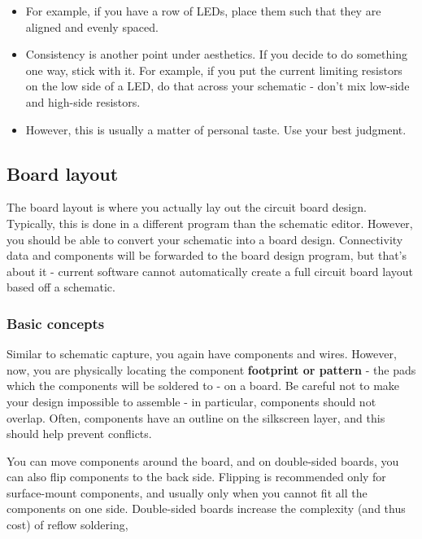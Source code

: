 \documentclass[letterpaper]{article}
\begin{document}
\begin{itemize}
\begin{itemize}
\item {\sffamily\color[rgb]{0.30980393,0.5058824,0.7411765}
For example, if you have a row of LEDs, place them such that they are aligned and evenly spaced.}
\item {\sffamily\color[rgb]{0.30980393,0.5058824,0.7411765}
Consistency is another point under aesthetics. If you decide to do something one way, stick with it. For example, if you
put the current limiting resistors on the low side of a LED, do that across your schematic - don't mix low-side and
high-side resistors.}
\item {\sffamily\color[rgb]{0.30980393,0.5058824,0.7411765}
However, this is usually a matter of personal taste. Use your best judgment.}
\end{itemize}
\end{itemize}
\subsection{Board layout}
\hypertarget{Toc337742681}{}{\sffamily\color[rgb]{0.30980393,0.5058824,0.7411765}
The board layout is where you actually lay out the circuit board design. Typically, this is done in a different program
than the schematic editor. However, you should be able to convert your schematic into a board design. Connectivity data
and components will be forwarded to the board design program, but that's about it - current software cannot
automatically create a full circuit board layout based off a schematic.}

\subsubsection{Basic concepts}
\hypertarget{Toc337742682}{}{\sffamily\color[rgb]{0.30980393,0.5058824,0.7411765}
Similar to schematic capture, you again have components and wires. However, now, you are physically locating the
component \textbf{footprint or pattern} - the pads which the components will be soldered to - on a board. Be careful
not to make your design impossible to assemble - in particular, components should not overlap. Often, components have
an outline on the silkscreen layer, and this should help prevent conflicts.}

{\sffamily\color[rgb]{0.30980393,0.5058824,0.7411765}
You can move components around the board, and on double-sided boards, you can also flip components to the back side.
Flipping is recommended only for surface-mount components, and usually only when you cannot fit all the components on
one side. Double-sided boards increase the complexity (and thus cost) of reflow soldering,}
\end{document}
